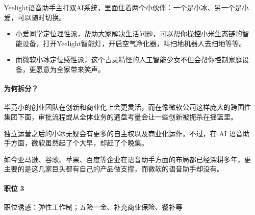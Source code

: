 \documentclass[letterpaper,11pt,english]{sphinxmanual}
\begin{document}
Yeelight语音助手主打双AI系统，里面住着两个小伙伴：一个是小冰、另一个是小爱，可以随时切换。
\begin{itemize}
\item {} 
小爱同学定位理性派，帮助大家解决生活问题，可以帮你操控小米生态链的智能设备，打开Yeelight智能灯，开启空气净化器，叫扫地机器人去扫地等等。

\item {} 
而微软小冰定位感性派，这个古灵精怪的人工智能少女不但会帮你控制家庭设备，更愿意为全家带来笑声。%
\begin{footnote}[933]\sphinxAtStartFootnote
{}
%
\end{footnote}

\end{itemize}


\paragraph{为何拆分？}
\label{\detokenize{chapter_company/xiaoice:id5}}
毕竟小的创业团队在创新和商业化上会更灵活，而在像微软公司这样庞大的跨国性集团下面，审批流程或从全体业务的通盘考量会让一些创新被扼杀在摇篮里。%
\begin{footnote}[934]\sphinxAtStartFootnote
{}
%
\end{footnote}

独立运营之后的小冰无疑会有更多的自主权以及商业化运作。不过，在 AI
语音助手方面，微软虽然起了个大早，却赶了个晚集。

如今亚马逊、谷歌、苹果、百度等企业在语音助手方面的布局都已经深耕多年，更主要的是这几家巨头都有自己的产品做支撑，而微软的语音助手却没有。


\paragraph{职位 3\sphinxfootnotemark[935]}
\label{\detokenize{chapter_company/xiaoice:id6}}%
\begin{footnotetext}[935]\sphinxAtStartFootnote
{}
%
\end{footnotetext}\ignorespaces 
职位诱惑：弹性工作制；五险一金、补充商业保险、餐补等
\end{document}
